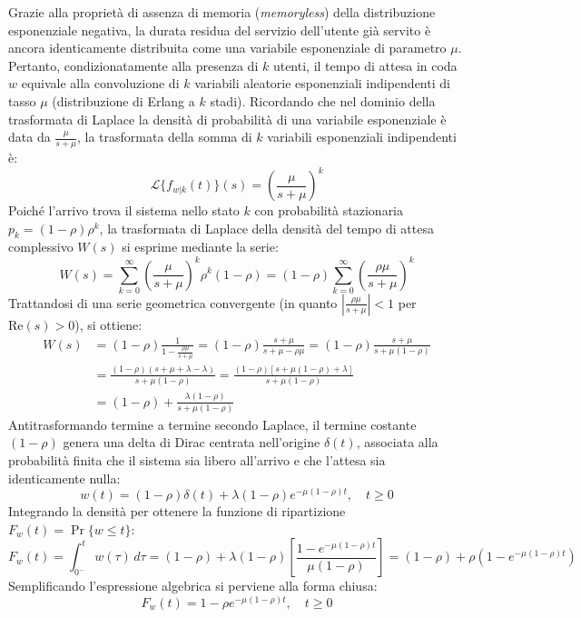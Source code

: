 \documentclass[11pt, a4paper]{article}
\begin{document}
Grazie alla proprietà di assenza di memoria (\emph{memoryless}) della distribuzione esponenziale negativa, la durata residua del servizio dell'utente già servito è ancora identicamente distribuita come una variabile esponenziale di parametro $\mu$. Pertanto, condizionatamente alla presenza di $k$ utenti, il tempo di attesa in coda $w$ equivale alla convoluzione di $k$ variabili aleatorie esponenziali indipendenti di tasso $\mu$ (distribuzione di Erlang a $k$ stadi). Ricordando che nel dominio della trasformata di Laplace la densità di probabilità di una variabile esponenziale è data da $\frac{\mu}{s+\mu}$, la trasformata della somma di $k$ variabili esponenziali indipendenti è:
\[
\mathcal{L}\{f_{w|k}(t)\}(s) = \left( \frac{\mu}{s + \mu} \right)^k
\]
Poiché l'arrivo trova il sistema nello stato $k$ con probabilità stazionaria $p_k = (1 - \rho)\rho^k$, la trasformata di Laplace della densità del tempo di attesa complessivo $W(s)$ si esprime mediante la serie:
\[
W(s) = \sum_{k=0}^{\infty} \left( \frac{\mu}{s + \mu} \right)^k \rho^k (1 - \rho) = (1 - \rho) \sum_{k=0}^{\infty} \left( \frac{\rho \mu}{s + \mu} \right)^k
\]
Trattandosi di una serie geometrica convergente (in quanto $\left| \frac{\rho \mu}{s + \mu} \right| < 1$ per $\mathrm{Re}(s) > 0$), si ottiene:
\begin{align*}
W(s) &= (1 - \rho) \frac{1}{1 - \frac{\rho \mu}{s + \mu}} = (1 - \rho) \frac{s + \mu}{s + \mu - \rho \mu} = (1 - \rho) \frac{s + \mu}{s + \mu(1 - \rho)} \\
&= \frac{(1 - \rho)(s + \mu + \lambda - \lambda)}{s + \mu(1 - \rho)} = \frac{(1 - \rho)[s + \mu(1 - \rho) + \lambda]}{s + \mu(1 - \rho)} \\
&= (1 - \rho) + \frac{\lambda(1 - \rho)}{s + \mu(1 - \rho)}
\end{align*}
Antitrasformando termine a termine secondo Laplace, il termine costante $(1 - \rho)$ genera una delta di Dirac centrata nell'origine $\delta(t)$, associata alla probabilità finita che il sistema sia libero all'arrivo e che l'attesa sia identicamente nulla:
\[
\boxed{w(t) = (1 - \rho)\delta(t) + \lambda(1 - \rho) e^{-\mu(1 - \rho)t}, \quad t \ge 0}
\]
Integrando la densità per ottenere la funzione di ripartizione $F_w(t) = \Pr\{w \le t\}$:
\[
F_w(t) = \int_{0^{-}}^t w(\tau)\, d\tau = (1 - \rho) + \lambda(1 - \rho) \left[ \frac{1 - e^{-\mu(1 - \rho)t}}{\mu(1 - \rho)} \right] = (1 - \rho) + \rho \left(1 - e^{-\mu(1 - \rho)t}\right)
\]
Semplificando l'espressione algebrica si perviene alla forma chiusa:
\[
\boxed{F_w(t) = 1 - \rho e^{-\mu(1 - \rho)t}, \quad t \ge 0}
\]
\end{document}

